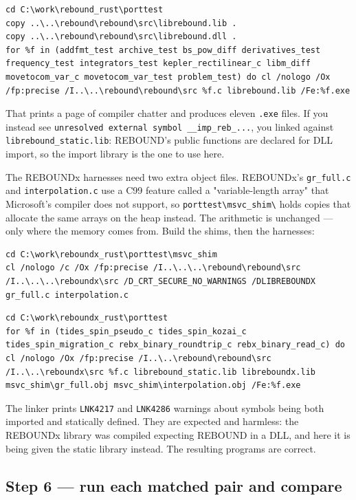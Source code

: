 \documentclass[11pt]{article}
\begin{document}
\begin{lstlisting}
cd C:\work\rebound_rust\porttest
copy ..\..\rebound\rebound\src\librebound.lib .
copy ..\..\rebound\rebound\src\librebound.dll .
for %f in (addfmt_test archive_test bs_pow_diff derivatives_test frequency_test integrators_test kepler_rectilinear_c libm_diff movetocom_var_c movetocom_var_test problem_test) do cl /nologo /Ox /fp:precise /I..\..\rebound\rebound\src %f.c librebound.lib /Fe:%f.exe
\end{lstlisting}

That prints a page of compiler chatter and produces eleven \texttt{.exe} files. If you instead see \texttt{unresolved external symbol \_\_imp\_reb\_...}, you linked against \texttt{librebound\_static.lib}: REBOUND's public functions are declared for DLL import, so the import library is the one to use here.

The REBOUNDx harnesses need two extra object files. REBOUNDx's \texttt{gr\_full.c} and \texttt{interpolation.c} use a C99 feature called a "variable-length array" that Microsoft's compiler does not support, so \texttt{porttest\textbackslash{}msvc\_shim\textbackslash{}} holds copies that allocate the same arrays on the heap instead. The arithmetic is unchanged --- only where the memory comes from. Build the shims, then the harnesses:

\begin{lstlisting}
cd C:\work\reboundx_rust\porttest\msvc_shim
cl /nologo /c /Ox /fp:precise /I..\..\..\rebound\rebound\src /I..\..\..\reboundx\src /D_CRT_SECURE_NO_WARNINGS /DLIBREBOUNDX gr_full.c interpolation.c
\end{lstlisting}

\begin{lstlisting}
cd C:\work\reboundx_rust\porttest
for %f in (tides_spin_pseudo_c tides_spin_kozai_c tides_spin_migration_c rebx_binary_roundtrip_c rebx_binary_read_c) do cl /nologo /Ox /fp:precise /I..\..\rebound\rebound\src /I..\..\reboundx\src %f.c librebound_static.lib libreboundx.lib msvc_shim\gr_full.obj msvc_shim\interpolation.obj /Fe:%f.exe
\end{lstlisting}

The linker prints \texttt{LNK4217} and \texttt{LNK4286} warnings about symbols being both imported and statically defined. They are expected and harmless: the REBOUNDx library was compiled expecting REBOUND in a DLL, and here it is being given the static library instead. The resulting programs are correct.

\subsection{Step 6 --- run each matched pair and compare}
\end{document}

